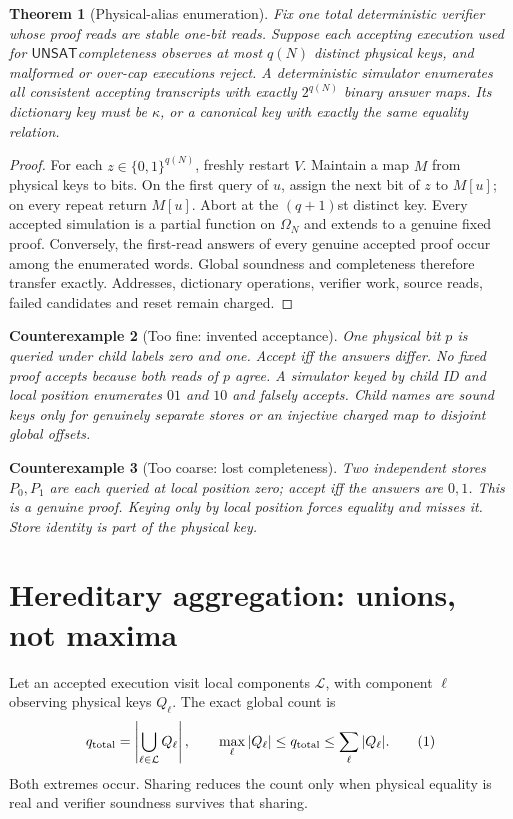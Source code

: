 \documentclass[11pt]{article}
\newtheorem{theorem}{Theorem}
\newtheorem{counterexample}[theorem]{Counterexample}
\newcommand{\UNSAT}{\ensuremath{\mathsf{UNSAT}}}
\begin{document}
\begin{theorem}[Physical-alias enumeration]
\label{th:alias}
Fix one total deterministic verifier whose proof reads are stable one-bit
reads. Suppose each accepting execution used for \UNSAT completeness
observes at most $q(N)$ distinct physical keys, and malformed or over-cap
executions reject. A deterministic simulator enumerates all consistent
accepting transcripts with exactly $2^{q(N)}$ binary answer maps. Its
dictionary key must be $\kappa$, or a canonical key with exactly the same
equality relation.
\end{theorem}
\begin{proof}
For each $z\in\{0,1\}^{q(N)}$, freshly restart $V$. Maintain a map $M$ from
physical keys to bits. On the first query of $u$, assign the next bit of $z$
to $M[u]$; on every repeat return $M[u]$. Abort at the $(q+1)$st distinct
key. Every accepted simulation is a partial function on $\Omega_N$ and
extends to a genuine fixed proof. Conversely, the first-read answers of
every genuine accepted proof occur among the enumerated words. Global
soundness and completeness therefore transfer exactly. Addresses,
dictionary operations, verifier work, source reads, failed candidates and
reset remain charged.
\end{proof}

\begin{counterexample}[Too fine: invented acceptance]
One physical bit $p$ is queried under child labels zero and one. Accept iff
the answers differ. No fixed proof accepts because both reads of $p$ agree.
A simulator keyed by child ID and local position enumerates $01$ and $10$
and falsely accepts. Child names are sound keys only for genuinely separate
stores or an injective charged map to disjoint global offsets.
\end{counterexample}

\begin{counterexample}[Too coarse: lost completeness]
Two independent stores $P_0,P_1$ are each queried at local position zero;
accept iff the answers are $0,1$. This is a genuine proof. Keying only by
local position forces equality and misses it. Store identity is part of the
physical key.
\end{counterexample}

\section{Hereditary aggregation: unions, not maxima}
Let an accepted execution visit local components $\mathcal L$, with component
$\ell$ observing physical keys $Q_\ell$. The exact global count is
\[
 q_{\rm total}=\left|\bigcup_{\ell\in\mathcal L}Q_\ell\right|,
\qquad
\max_\ell |Q_\ell|\le q_{\rm total}\le\sum_\ell |Q_\ell|. \tag{1}
\]
Both extremes occur. Sharing reduces the count only when physical equality
is real and verifier soundness survives that sharing.
\end{document}
